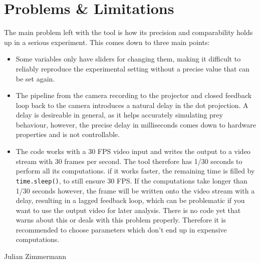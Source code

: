 \documentclass[12pt]{article}
\begin{document}
\section{Problems \& Limitations}
The main problem left with the tool is how its precision and comparability holds up in a serious experiment. This comes down to three main points:
\begin{itemize}
	\item Some variables only have sliders for changing them, making it difficult to reliably reproduce the experimental setting without a precise value that can be set again.
	\item The pipeline from the camera recording to the projector and closed feedback loop back to the camera introduces a natural delay in the dot projection. A delay is desireable in general, as it helps accurately simulating prey behaviour, however, the precise delay in milliseconds comes down to hardware properties and is not controllable.
	\item The code works with a 30 FPS video input and writes the output to a video stream with 30 frames per second. The tool therefore has 1/30 seconds to perform all its computations. if it works faster, the remaining time is filled by \Verb|time.sleep()|, to still ensure 30 FPS. If the computations take longer than 1/30 seconds however, the frame will be written onto the video stream with a delay, resulting in a lagged feedback loop, which can be problematic if you want to use the output video for later analysis. There is no code yet that warns about this or deals with this problem properly. Therefore it is recommended to choose parameters which don't end up in expensive computations.
\end{itemize}



\vfill
\hfill Julian Zimmermann
\end{document}
